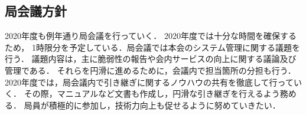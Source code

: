 \subsection*{局会議方針}


2020年度も例年通り局会議を行っていく．
2020年度では十分な時間を確保するため，
1時限分を予定している．局会議では本会のシステム管理に関する議題を行う．
議題内容は，主に脆弱性の報告や会内サービスの向上に関する議論及び管理である．
それらを円滑に進めるために，会議内で担当箇所の分担も行う．
2020年度では，局会議内で引き継ぎに関するノウハウの共有を徹底して行っていく．
その際，マニュアルなど文書も作成し，円滑な引き継ぎを行えるよう務める．
局員が積極的に参加し，技術力向上も促せるように努めていきたい．
